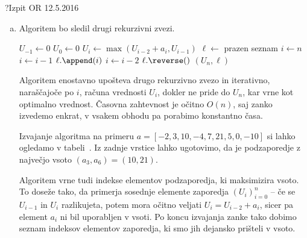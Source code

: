 \begin{naloga}{?}{Izpit OR 12.5.2016}
\begin{odgovor}
\begin{enumerate}[(a)]
Vrstni red iskanja vrednosti $U_i$ določimo z naraščajočim zaporedjem indeksov $i$, ko $1\leq i \leq n$,
saj imamo tako pred reševanjem problema $U_i$
definirane vse predhodne vrednosti.
Ko izračunamo vse vrednosti $U_i$,
je maksimum vsote zaporedja enak $U^* = U_n$,
kar sledi neposredno iz definicije vrednosti $U_n$.

\item Algoritem bo sledil drugi rekurzivni zvezi.

\begin{small}
\begin{algorithmic}
	\State $U_{-1} \gets 0$
	\State $U_0 \gets 0$
		\State $U_i \gets \max(U_{i-2} + a_i, U_{i-1})$
	\EndFor
    \State $\ell \gets$ prazen seznam
    \State $i \gets n$
            \State $i \gets i-1$
        \Else
            \State $\ell.\append(i)$
            \State $i \gets i-2$
        \EndIf
    \EndWhile
    \State $\ell.\reverse()$
	\State \Return $(U_n, \ell)$
\EndFunction
\end{algorithmic}
\end{small}

Algoritem enostavno upošteva drugo rekurzivno zvezo in iterativno,
naraščajoče po $i$,
računa vrednosti $U_i$, dokler ne pride do $U_n$,
kar vrne kot optimalno vrednost.
Časovna zahtevnost je očitno $O(n)$, saj zanko izvedemo enkrat,
v vsakem obhodu pa porabimo konstantno časa.

Izvajanje algoritma na primeru $a = [-2, 3, 10, -4, 7, 21, 5, 0, -10]$
si lahko ogledamo v tabeli~\tab.
Iz zadnje vrstice lahko ugotovimo,
da je podzaporedje z največjo vsoto $(a_3, a_6) = (10, 21)$.

Algoritem vrne tudi indekse elementov podzaporedja, ki maksimizira vsoto.
To doseže tako, da primerja sosednje elemente zaporedja $(U_i)_{i=0}^n$
-- če se $U_{i-1}$ in $U_i$ razlikujeta,
potem mora očitno veljati $U_i = U_{i-2} + a_i$,
sicer pa element $a_i$ ni bil uporabljen v vsoti.
Po koncu izvajanja zanke tako dobimo seznam indeksov elementov zaporedja,
ki smo jih dejansko prišteli v vsoto.
\end{enumerate}


\end{odgovor}
\end{naloga}
